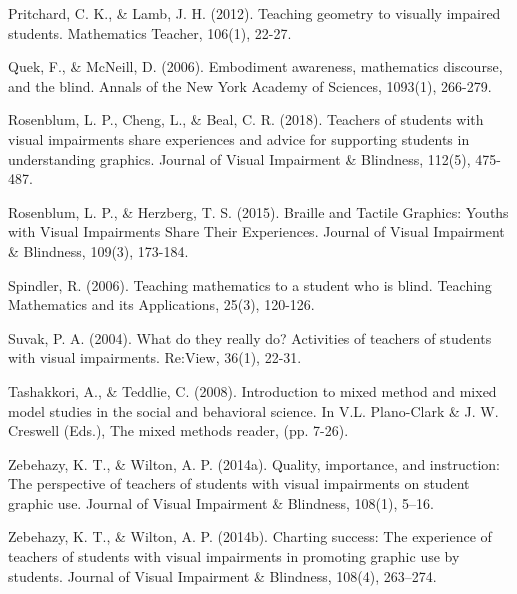 \documentclass[11.5pt]{sig-alternate} %
\begin{document}
Pritchard, C. K., \& Lamb, J. H. (2012). Teaching geometry to visually impaired students. Mathematics Teacher, 106(1), 22-27.

Quek, F., \& McNeill, D. (2006). Embodiment awareness, mathematics discourse, and the blind. Annals of the New York Academy of Sciences, 1093(1), 266-279.

Rosenblum, L. P., Cheng, L., \& Beal, C. R. (2018). Teachers of students with visual impairments share experiences and advice for supporting students in understanding graphics. Journal of Visual Impairment \& Blindness, 112(5), 475-487.

Rosenblum, L. P., \& Herzberg, T. S. (2015). Braille and Tactile Graphics: Youths with Visual Impairments Share Their Experiences. Journal of Visual Impairment \& Blindness, 109(3), 173-184.

Spindler, R. (2006). Teaching mathematics to a student who is blind. Teaching Mathematics and its Applications, 25(3), 120-126.

Suvak, P. A. (2004). What do they really do? Activities of teachers of students with visual impairments. Re:View, 36(1), 22-31.

Tashakkori, A., \& Teddlie, C. (2008). Introduction to mixed method and mixed model studies in the social and behavioral science. In V.L.
Plano-Clark \& J. W. Creswell (Eds.), The mixed methods reader, (pp. 7-26).

Zebehazy, K. T., \& Wilton, A. P. (2014a). Quality, importance, and instruction: The perspective of teachers of students with visual impairments on student graphic use. Journal of Visual Impairment \& Blindness, 108(1), 5–16.

Zebehazy, K. T., \& Wilton, A. P. (2014b). Charting success: The experience of teachers of students with visual impairments in promoting graphic use by students. Journal of Visual Impairment \& Blindness, 108(4), 263–274.
\end{document}
